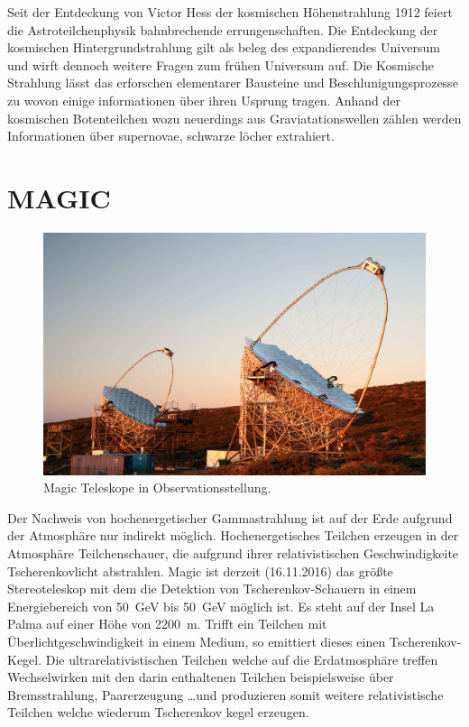 Seit der Entdeckung von Victor Hess der kosmischen Höhenstrahlung
1912 feiert die Astroteilchenphysik bahnbrechende errungenschaften.
Die Entdeckung der kosmischen Hintergrundstrahlung gilt als beleg des
expandierendes Universum und wirft dennoch weitere Fragen zum frühen Universum auf.
Die Kosmische Strahlung lässt das erforschen elementarer Bausteine und
Beschlunigungsprozesse zu wovon
einige informationen über ihren Usprung tragen.
Anhand der kosmischen Botenteilchen wozu neuerdings aus Graviatationswellen
zählen werden Informationen über supernovae, schwarze löcher extrahiert.
\section*{MAGIC}%
\label{sec:magic}
\begin{figure}
		\includegraphics[width=\linewidth]{pictures/magic.JPG}
		\caption{Magic Teleskope in Observationsstellung.}%
		\label{fig:magic}
\end{figure}
Der Nachweis von hochenergetischer Gammastrahlung ist auf der Erde aufgrund der
Atmosphäre nur indirekt möglich.
Hochenergetisches Teilchen erzeugen in der Atmosphäre Teilchenschauer, die
aufgrund ihrer relativistischen Geschwindigkeite Tscherenkovlicht abstrahlen.
Magic ist derzeit (16.11.2016) das größte Stereoteleskop mit dem die
Detektion von Tscherenkov-Schauern in einem Energiebereich von
\SI{50}{\giga\electronvolt} bis \SI{50}{\giga\electronvolt} möglich ist.
Es steht auf der Insel La Palma auf einer Höhe von \SI{2200}{\meter}.
Trifft ein Teilchen mit Überlichtgeschwindigkeit in einem Medium, so emittiert
dieses einen Tscherenkov-Kegel.
Die ultrarelativistischen Teilchen welche auf die Erdatmosphäre treffen
Wechselwirken mit den darin enthaltenen Teilchen beispielsweise über
Bremsstrahlung, Paarerzeugung \ldots und produzieren somit weitere
relativistische Teilchen welche wiederum Tscherenkov kegel erzeugen.

